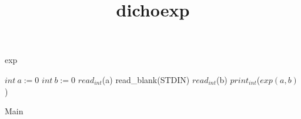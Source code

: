 \documentclass[8pt]{article}
\title{dichoexp}
\begin{document}
\maketitle
\begin{algorithm}[H]

\caption{exp}
\end{algorithm}

\begin{algorithm}[H]
$int\:a := 0$\;
$int\:b := 0$\;
$read_{int}$(a)\;
read\_blank(STDIN)\;
$read_{int}$(b)\;
$print_{int}$($ exp(a, b) $)\;
\caption{Main}
\end{algorithm}
\end{document}
